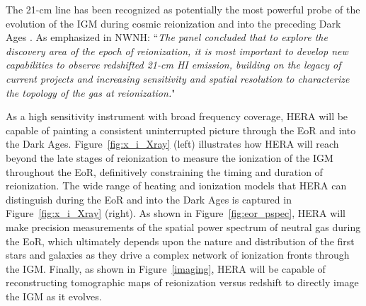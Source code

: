 \documentclass[preprint]{aastex}
\def\HI{{H{\small I }}}
\begin{document}
The 21-cm line has been recognized as potentially the most
powerful probe of the evolution of the IGM during cosmic 
reionization and into
the preceding Dark Ages \citep{morales_wyithe2010,furlanetto_et_al2006}.
As emphasized in NWNH: ``{\it The panel concluded that to explore the discovery
area of the epoch of reionization, it is most important to develop new
capabilities to observe redshifted 21-cm \HI emission, building on the legacy of
current projects and increasing sensitivity and spatial resolution to
characterize the topology of the gas at reionization.}"

As a high sensitivity instrument with broad frequency coverage, HERA will be
capable of painting a consistent uninterrupted picture through the EoR and into
the Dark Ages.
Figure~\ref{fig:x_i_Xray} (left) illustrates how HERA will
reach beyond the late stages of reionization to measure the
ionization of the IGM throughout the EoR, definitively constraining the timing
and duration of reionization.
The wide range of heating and ionization models that HERA
can distinguish during the EoR and into the Dark Ages is captured in
Figure~\ref{fig:x_i_Xray} (right).  
As shown in Figure~\ref{fig:eor_pspec}, 
HERA will make precision measurements of the
spatial power spectrum of neutral gas during the EoR, which ultimately depends
upon the nature and distribution of the first stars and galaxies as they drive
a complex network of ionization fronts through the IGM.
Finally, as shown in Figure~\ref{imaging}, HERA will be capable of reconstructing
tomographic maps of reionization versus redshift to directly image the IGM as
it evolves.
\end{document}
